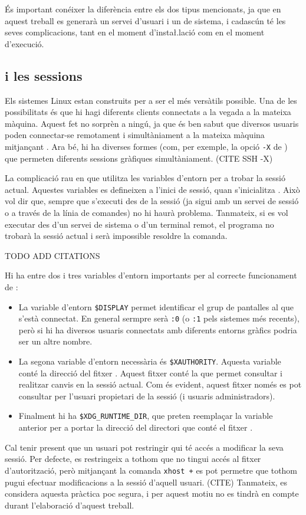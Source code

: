 És important conéixer la diferència entre els dos tipus mencionats, ja que en
aquest treball es generarà un servei d'usuari i un de sistema, i cadascún té
les seves complicacions, tant en el moment d'insta\l.lació com en el moment
d'execució.

\subsection{ i les sessions}
\label{subsec:xrandr}

Els sistemes Linux estan construits per a ser el més versàtils possible. Una
de les possibilitats és que hi hagi diferents clients connectats a la vegada
a la mateixa màquina. Aquest fet no sorprèn a ningú, ja que és ben sabut que
diversos usuaris poden connectar-se remotament i simultàniament a la mateixa
màquina mitjançant . Ara bé, hi ha diverses formes (com, per exemple,
la opció \verb|-X| de ) que permeten diferents sessions gràfiques
simultàniament. (CITE SSH -X)

La complicació rau en que  utilitza les variables d'entorn per a
trobar la sessió actual. Aquestes variables es defineixen a l'inici de sessió,
quan s'inicialitza . Això vol dir que, sempre que s'executi
 des de la sessió (ja sigui amb un servei de sessió o a través de
la línia de comandes) no hi haurà problema.
Tanmateix, si es vol executar  des d'un servei de sistema o d'un
terminal remot, el programa no trobarà la sessió actual i serà impossible
resoldre la comanda.

TODO ADD CITATIONS

Hi ha entre dos i tres variables d'entorn importants per al correcte funcionament
de :

\begin{itemize}
    \item La variable d'entorn \verb|$DISPLAY| permet identificar el grup de
    pantalles al que s'està connectat. En general sermpre serà \verb|:0| (o 
    \verb|:1| pels sistemes més recents), però si hi ha diversos usuaris
    connectats amb diferents entorns gràfics podria ser un altre nombre.
    \item La segona variable d'entorn necessària és \verb|$XAUTHORITY|. Aquesta
    variable conté la direcció del fitxer . Aquest fitxer
    conté la  que permet consultar i realitzar canvis en la sessió
    actual. Com és evident, aquest fitxer només es pot consultar per l'usuari
    propietari de la sessió (i usuaris administradors).
    \item Finalment hi ha \verb|$XDG_RUNTIME_DIR|, que preten reemplaçar la
    variable anterior per a portar la direcció del directori que conté el fitxer
    .
\end{itemize}

Cal tenir present que un usuari pot restringir qui té accés a modificar la
seva sessió. Per defecte, es restringeix a tothom que no tingui accés al
fitxer d'autorització, però mitjançant la comanda \verb|xhost +| es pot permetre
que tothom pugui efectuar modificacions a la sessió d'aquell usuari. (CITE)
Tanmateix, es considera aquesta pràctica poc segura, i per aquest motiu no es
tindrà en compte durant l'elaboració d'aquest treball.
